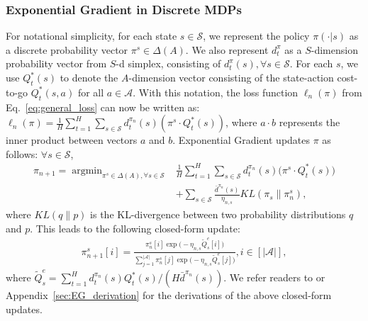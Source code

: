 \documentclass{article}
\newcommand{\BB}[1]{\textcolor{red}{\bf Byron: {#1}}}
\begin{document}
\subsubsection{Exponential Gradient in Discrete MDPs}
For notational simplicity, for each state $s\in\mathcal{S}$, we represent the policy $\pi(\cdot |s)$ as a discrete probability vector $\pi^s \in \Delta(A)$. We also represent $d_t^{\pi}$ as a ${S}$-dimension probability vector from $S$-d simplex, consisting of $d_t^{\pi}(s), \forall s\in\mathcal{S}$. 
For each $s$, we use $Q^*_t(s)$ to denote the $A$-dimension vector consisting of the state-action cost-to-go $Q^*_t(s,a)$ for all $a\in\mathcal{A}$. With this notation, the loss function $\ell_n(\pi)$ from Eq.~\ref{eq:general_loss} can now be written as: $\ell_n(\pi) = \frac{1}{H}\sum_{t=1}^H \sum_{s\in\mathcal{S}} d_t^{\pi_n}(s)( \pi^s\cdot Q^*_t(s))$,
where $a\cdot b$ represents the inner product between vectors $a$ and $b$. Exponential Gradient updates $\pi$ as follows: $\forall s\in\mathcal{S}$,
\begin{align}
\label{eq:eg_argmax}
\pi_{n+1} = \mathop{\arg\min}_{\pi^s\in\Delta(A),\forall s\in\mathcal{S}}&\frac{1}{H}\sum_{t=1}^H \sum_{s\in\mathcal{S}} d_t^{\pi_n}(s)\big( \pi^s\cdot Q^*_t(s)\big) \nonumber \\ &+\sum_{s\in\mathcal{S}}\frac{\bar{d}^{\pi_n}(s)}{\eta_{n,s}}KL(\pi_s \| \pi^s_n), 
\end{align} where $KL(q\|p)$ is the KL-divergence between two probability distributions $q$ and $p$.
This leads to the following closed-form update:
\begin{align}
\label{eq:eg_closed_form}
\pi_{n+1}^s[i] = \frac{\pi_n^s[i]\exp\big(-\eta_{n,s} \tilde{Q}_s^e[i]\big)}{\sum_{j=1}^{|\mathcal{A}|}\pi_n^s[j]\exp\big(-\eta_{n,s} \tilde{Q}_s^e[j]\big)}, i\in [|\mathcal{A}|],
\end{align} where $\tilde{Q}_s^e = \sum_{t=1}^H d_t^{\pi_n}(s)Q^*_t(s) / (H\bar{d}^{\pi_n}(s))$. We refer readers to \cite{shalev2012online} or Appendix~\ref{sec:EG_derivation} for the derivations of the above closed-form updates. 
\end{document}
